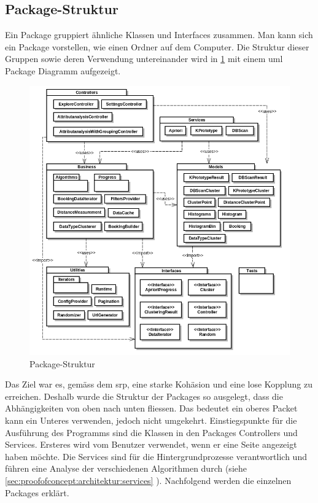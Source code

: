 \subsection{Package-Struktur}
\label{sec:proofofconcept:packagestruktur}
Ein Package gruppiert ähnliche Klassen und Interfaces zusammen. Man kann sich ein Package vorstellen, wie einen Ordner auf dem Computer. Die Struktur dieser Gruppen sowie deren Verwendung untereinander wird in \cref{fig:proofofconcept:packagestruktur:1} mit einem \gls{uml} Package Diagramm aufgezeigt. 
\begin{figure}[H]
	\RawFloats
	\centering
	\includegraphics[width=1\textwidth]{images/diagram-package-diagram}
	\caption{Package-Struktur}
	\label{fig:proofofconcept:packagestruktur:1}
\end{figure}

Das Ziel war es, gemäss dem \gls{srp}, eine starke Kohäsion und eine lose Kopplung zu erreichen. Deshalb wurde die Struktur der Packages so ausgelegt, dass die Abhängigkeiten von oben nach unten fliessen. Das bedeutet ein oberes Packet kann ein Unteres verwenden, jedoch nicht umgekehrt. Einstiegspunkte für die Ausführung des Programms sind die Klassen in den Packages Controllers und Services. Ersteres wird vom Benutzer verwendet, wenn er eine Seite angezeigt haben möchte. Die Services sind für die Hintergrundprozesse verantwortlich und führen eine Analyse der verschiedenen Algorithmen durch (siehe \cref{sec:proofofconcept:architektur:services} ). Nachfolgend werden die einzelnen Packages erklärt.

